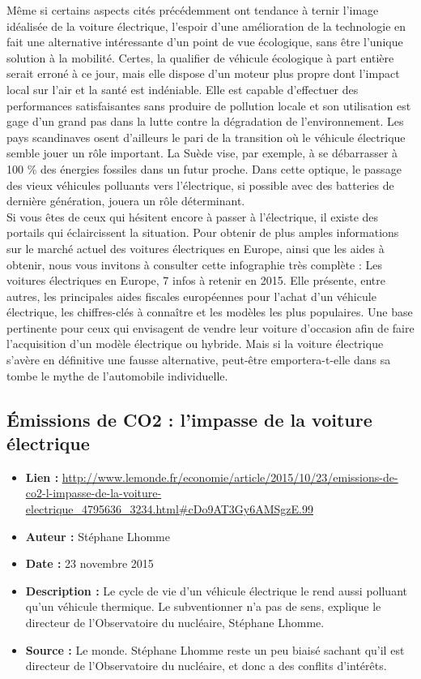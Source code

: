 \documentclass[8pt]{article}
\begin{document}
Même si certains aspects cités précédemment ont tendance à ternir l’image idéalisée de la voiture électrique, l’espoir d’une amélioration de la technologie en fait une alternative intéressante d’un point de vue écologique, sans être l’unique solution à la mobilité. Certes, la qualifier de véhicule écologique à part entière serait erroné à ce jour, mais elle dispose d’un moteur plus propre dont l’impact local sur l’air et la santé est indéniable. Elle est capable d’effectuer des performances satisfaisantes sans produire de pollution locale et son utilisation est gage d’un grand pas dans la lutte contre la dégradation de l’environnement. Les pays scandinaves osent d’ailleurs le pari de la transition où le véhicule électrique semble jouer un rôle important. La Suède vise, par exemple, à se débarrasser à 100 \% des énergies fossiles dans un futur proche. Dans cette optique, le passage des vieux véhicules polluants vers l’électrique, si possible avec des batteries de dernière génération, jouera un rôle déterminant.\\

Si vous êtes de ceux qui hésitent encore à passer à l’électrique, il existe des portails qui éclaircissent la situation. Pour obtenir de plus amples informations sur le marché actuel des voitures électriques en Europe, ainsi que les aides à obtenir, nous vous invitons à consulter cette infographie très complète : Les voitures électriques en Europe, 7 infos à retenir en 2015. Elle présente, entre autres, les principales aides fiscales européennes pour l’achat d’un véhicule électrique, les chiffres-clés à connaître et les modèles les plus populaires. Une base pertinente pour ceux qui envisagent de vendre leur voiture d’occasion afin de faire l’acquisition d’un modèle électrique ou hybride. Mais si la voiture électrique s’avère en définitive une fausse alternative, peut-être emportera-t-elle dans sa tombe le mythe de l’automobile individuelle.

\newpage
\subsection{Émissions de CO2  : l’impasse de la voiture électrique}
 
\begin{itemize}
	\item \textbf{Lien : }  \url{http://www.lemonde.fr/economie/article/2015/10/23/emissions-de-co2-l-impasse-de-la-voiture-electrique_4795636_3234.html#cDo9AT3Gy6AMSgzE.99} 
	\item \textbf{Auteur :} Stéphane Lhomme
	\item \textbf{Date : } 23 novembre 2015
	\item \textbf{Description : } Le cycle de vie d’un véhicule électrique le rend aussi polluant qu’un véhicule thermique. Le subventionner n’a pas de sens, explique le directeur de l’Observatoire du nucléaire, Stéphane Lhomme.
	\item \textbf{Source : } Le monde. Stéphane Lhomme reste un peu biaisé sachant qu'il est directeur de l’Observatoire du nucléaire, et donc a des conflits d'intérêts.
\end{itemize}
\end{document}
